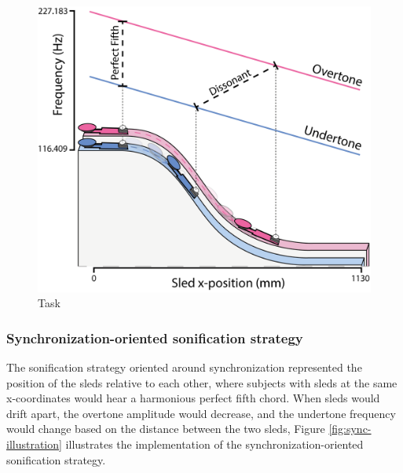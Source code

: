 \documentclass[10pt,a4paper,onecolumn]{article}
\begin{document}
\begin{figure}[h]

{\centering \includegraphics[width=1\linewidth]{figures/task_sonif_illustration} 

}

\caption{Task}\label{fig:task-illustration}
\end{figure}

\hypertarget{synchronization-oriented-sonification-strategy}{%
\subsubsection{Synchronization-oriented sonification strategy}\label{synchronization-oriented-sonification-strategy}}

The sonification strategy oriented around synchronization represented the position of the sleds relative to each other, where subjects with sleds at the same x-coordinates would hear a harmonious perfect fifth chord. When sleds would drift apart, the overtone amplitude would decrease, and the undertone frequency would change based on the distance between the two sleds, Figure \ref{fig:sync-illustration} illustrates the implementation of the synchronization-oriented sonification strategy.
\end{document}
